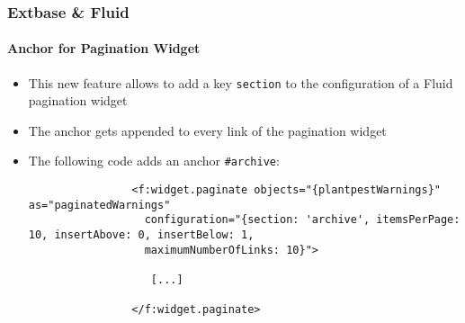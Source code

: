 %

\begin{frame}[fragile]
	\frametitle{Extbase \& Fluid}
	\framesubtitle{Anchor for Pagination Widget}

	\lstset{basicstyle=\tiny\ttfamily}

	\begin{itemize}

		\item This new feature allows to add a key \texttt{section} to the configuration of a
			Fluid pagination widget

		\item The anchor gets appended to every link of the pagination widget

		\item The following code adds an anchor \texttt{\#archive}:

			\begin{lstlisting}
				<f:widget.paginate objects="{plantpestWarnings}" as="paginatedWarnings"
				  configuration="{section: 'archive', itemsPerPage: 10, insertAbove: 0, insertBelow: 1,
				  maximumNumberOfLinks: 10}">

				   [...]

				</f:widget.paginate>
			\end{lstlisting}

	\end{itemize}

\end{frame}


